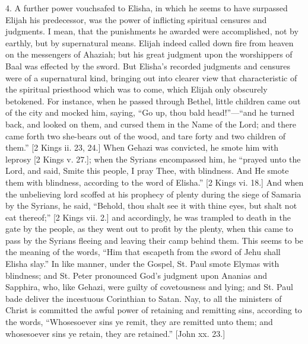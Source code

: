 4. A further power vouchsafed to Elisha, in which he seems to have
surpassed Elijah his predecessor, was the power of inflicting
spiritual censures and judgments. I mean, that the punishments he
awarded were accomplished, not by earthly, but by supernatural means.
Elijah indeed called down fire from heaven on the messengers of
Ahaziah; but his great judgment upon the worshippers of Baal was
effected by the sword. But Elisha's recorded judgments and censures
were of a supernatural kind, bringing out into clearer view that
characteristic of the spiritual priesthood which was to come, which
Elijah only obscurely betokened. For instance, when he passed through
Bethel, little children came out of the city and mocked him, saying,
``Go up, thou bald head!''—``and he turned back, and
looked on them, and cursed them in the Name of the Lord; and there came
forth two she-bears out of the wood, and tare forty and two children
of them.'' [2 Kings ii. 23, 24.] When Gehazi was convicted, he
smote him with leprosy [2 Kings v. 27.]; when the Syrians encompassed
him, he ``prayed unto the Lord, and said, Smite this people, I
pray Thee, with blindness. And He smote them with blindness, according
to the word of Elisha.'' [2 Kings vi. 18.] And when the
unbelieving lord scoffed at his prophecy of plenty during the siege of
Samaria by the Syrians, he said, ``Behold, thou shalt see it with
thine eyes, but shalt not eat thereof;'' [2 Kings vii. 2.] and
accordingly, he was trampled to death in the gate by the people, as
they went out to profit by the plenty, when this came to pass by the
Syrians fleeing and leaving their camp behind them. This seems to be
the meaning of the words, ``Him that escapeth from the sword of
Jehu shall Elisha slay.'' In like manner, under the Gospel, St.
Paul smote Elymas with blindness; and St. Peter pronounced God's
judgment upon Ananias and Sapphira, who, like Gehazi, were guilty of
covetousness and lying; and St. Paul bade deliver the incestuous
Corinthian to Satan. Nay, to all the ministers of Christ is committed
the awful power of retaining and remitting sins, according to the
words, ``Whosesoever sins ye remit, they are remitted unto them;
and whosesoever sins ye retain, they are retained.'' [John xx.
23.]


